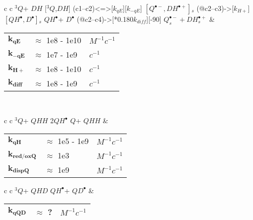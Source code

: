 \documentclass{article}
\def\IRP{$\left[Q^{\bullet -},DH^{\bullet +}\right]{}_s$}
\def\QH{$QH^{\bullet }$}
\def\D{$D^{\bullet }$}
\def\Q{$Q$}
\def\Qt{$^{3}Q$}
\def\DH{$DH$}
\def\QHH{$QHH$}
\def\QHD{$QHD$}
\def\QD{$QD^{\bullet }$}
\begin{document}
\begin{tabular}{ c c }
    \schemestart
    \Qt + \DH
    \arrow{<=>[$k_{diff}$][$k_{dis}$]}
    $[$\Qt,\DH$]$
    \arrow(c1--c2){<=>[$k_{qE}$][$k_{-qE}$]}
    \IRP
    \arrow(@c2--c3){->[$k_{H+}$]}
    $\left[QH^{\bullet},D^{\bullet}\right]{}_s$
    \arrow{->[$k_{diff}$]}
    \QH + \D
    \arrow(@c2--c4){->[*{0.180}$k_{diff}$]}[-90]
    $Q_s^{\bullet -} + DH_s^{\bullet +}$
    \schemestop
     & \begin{tabular}{ l l l }
           $\mathbf{k_{qE}}$   & $\approx$ 1e8 - 1e10 & $M^{-1}c^{-1}$ \\
           $\mathbf{k_{-qE}}$  & $\approx$ 1e7 - 1e9  & $c^{-1}$       \\
           $\mathbf{k_{H+}}$   & $\approx$ 1e8 - 1e10 & $c^{-1}$       \\
           $\mathbf{k_{diff}}$ & $\approx$ 1e8 - 1e9  & $c^{-1}$       \\\hline
       \end{tabular}
    \vspace{1.5mm}
    \\
\end{tabular}
\vspace{1.5mm}

\begin{tabular}{ c c }
    \schemestart
    \Qt + \QHH
    \arrow{->[$k_{qH}$]}
    2\QH
    \Q + \QHH
    \schemestop
     & \begin{tabular}{ l l l }
           $\mathbf{k_{qH}}$      & $\approx$ 1e5 - 1e9 & $M^{-1}c^{-1}$ \\
           $\mathbf{k_{red/oxQ}}$ & $\approx$ 1e3       & $M^{-1}c^{-1}$ \\
           $\mathbf{k_{dispQ}}$   & $\approx$ 1e9       & $M^{-1}c^{-1}$ \\\hline
       \end{tabular}
    \vspace{1.5mm}
\end{tabular}
\vspace{1.5mm}


\begin{tabular}{ c c }
    \schemestart
    \Qt + \QHD
    \arrow{->[$k_{qQD}$]}
    \QH + \QD
    \schemestop
     & \begin{tabular}{ l l l }
           $\mathbf{k_{qQD}}$ & $\approx$ ? & $M^{-1}c^{-1}$ \\\hline
       \end{tabular}
    \vspace{1.5mm}
\end{tabular}
\vspace{1.5mm}
\end{document}
